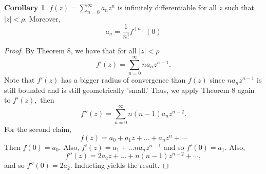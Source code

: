 \documentclass[10pt, oneside]{article}
\theoremstyle{definition}
\newtheorem{cor}{Corollary}
\begin{document}
\begin{cor}
    $f(z) = \sum_{n=0}^\infty a_n z^n$ is infinitely differentiable for all $z$ such that $|z| < \rho.$ Moreover, 
    \[a_n = \frac{1}{n!}f^{(n)}(0)\]
\end{cor}
\begin{proof}
    By Theorem 8, we have that for all $|z| < \rho$
    \[f'(z) = \sum_{n=0}^\infty n a_n z^{n-1}.\] Note that $f'(z)$ has a bigger radius of convergence than $f(z)$ since $na_n z^{n-1}$ is still bounded and is still geometrically 'small.' Thus, we apply Theorem 8 again to $f'(z),$ then 
    \[f''(z) = \sum_{n=0}^\infty n(n-1)a_n z^{n-2}.\] For the second claim, 
    \[f(z) = a_0 + a_1z + \dots +  a_nz^n + \cdots\] Then $f(0) = a_0.$ Also, $f'(z) = a_1 
 + \dots na_n z^{n-1}$ and so $f'(0) = a_1.$ Also, 
 \[f''(z) = 2a_2z + \dots  + n(n-1)z^{n-2} + \cdots,\] and so $f''(0) = 2a_2.$ Inducting yields the result.
\end{proof}
\end{document}
